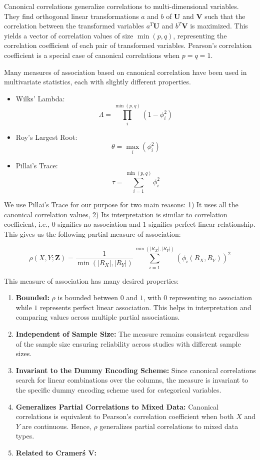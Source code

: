 \documentclass{uai2025} %
\begin{document}
Canonical correlations generalize correlations to multi-dimensional variables. They
find orthogonal linear transformations $ a $ and $ b $ of $ \bm{U} $ and $ \bm{V} $
such that the correlation between the transformed variables $ a^T \bm{U} $ and 
$ b^T \bm{V} $ is maximized. This yields a vector of correlation values of 
size $ \min(p, q) $, representing the correlation coefficient of each pair of 
transformed variables. Pearson's correlation coefficient is a special case of 
canonical correlations when $ p = q = 1 $.

Many measures of association based on canonical correlation have been used in
multivariate statistics, each with slightly different properties.
\begin{itemize}
	\item Wilks' Lambda:
		$$ \Lambda = \prod_{i}^{\min(p, q)} (1 - \phi_i^2) $$
	\item Roy's Largest Root: 
		$$ \theta = \max_i(\phi_i^2) $$
	\item Pillai's Trace: 
		$$ \tau = \sum_{i=1}^{\min(p, q)} \phi_i^2 $$
\end{itemize}

We use Pillai's Trace for our purpose for two main reasons: 1) It uses all the
canonical correlation values, 2) Its interpretation is similar to correlation
coefficient, i.e., $ 0 $ signifies no association and $ 1 $ signifies perfect
linear relationship. This gives us the following partial measure of
association:

\begin{equation}
	\rho(X, Y; \bm{Z}) = \frac{1}{\min(\rvert R_X \rvert, \rvert R_Y \rvert)}
	\sum_{i=1}^{\min(\rvert R_X \rvert, \rvert R_Y \rvert)} (\phi_i(R_X, R_Y))^2
\end{equation}

This measure of association has many desired properties:

\begin{enumerate}
	\item \textbf{Bounded: } $ \rho $ is bounded between $ 0 $ and $ 1 $,
		with $ 0 $ representing no association while $ 1 $ represents
		perfect linear association. This helps in interpretation and
		comparing values across multiple partial associations.
	\item \textbf{Independent of Sample Size: } The measure remains consistent
		regardless of the sample size ensuring reliability across 
		studies with different sample sizes.
	\item \textbf{Invariant to the Dummy Encoding Scheme: } Since canonical
		correlations search for linear combinations over the columns,
		the measure is invariant to the specific dummy encoding
		scheme used for categorical variables.
	\item \textbf{Generalizes Partial Correlations to Mixed Data: }
		Canonical correlations is equivalent to Pearson's correlation coefficient
		when both $ X $ and $ Y $ are continuous. Hence, $ \rho $ generalizes
		partial correlations to mixed data types.
	\item \textbf{Related to Cramer\'s V: } 
\end{enumerate}
\end{document}
